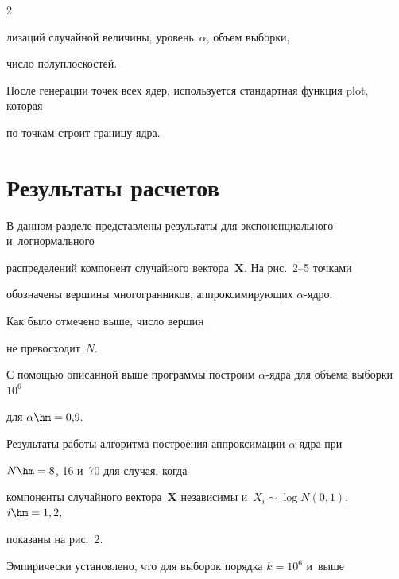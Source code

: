 \begin{multicols}{2}
\pagebreak



\noindent

ли\-за\-ций случайной величины, уровень~$\alpha$, объем выборки,

 чис\-ло полуплоскостей.



После генерации точек всех ядер, используется стандартная функция plot, которая 

по точ\-кам строит границу ядра.



\vspace*{-3pt}



\section{Результаты расчетов}



\vspace*{-2pt}



В данном разделе представлены результаты для экспоненциального и~логнормального 

распределений компонент случайного вектора~$\mathbf{X}.$ На рис.~2--5 точками

 обозначены вершины многогранников, аппроксимирующих $\alpha$-яд\-ро. 

 Как было отмечено выше, чис\-ло вершин

не превосходит~$N.$





С помощью описанной выше программы построим $\alpha$-яд\-ра для объема выборки~$10^6$ 

для $\alpha\hm=0{,}9.$

Результаты работы алгоритма построения аппроксимации $\alpha$-яд\-ра при 

$N\hm=8$, 16 и~70 для случая, когда

 компоненты случайного вектора~$\mathbf{X}$ независимы и~$X_i\sim \log

 N(0,1)$, $i\hm=1,2,$

показаны на рис.~2.













Эмпирически установлено, что для выборок порядка $k=10^6$ и~выше


\end{multicols}
